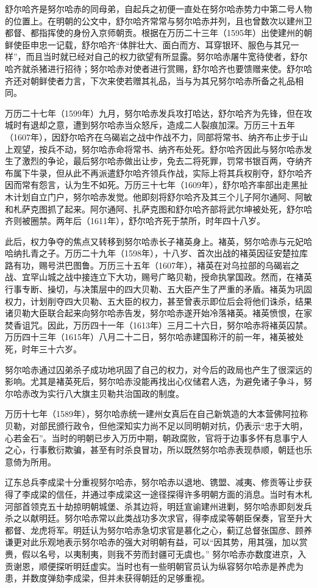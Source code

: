舒尔哈齐是努尔哈赤的同母弟，自起兵之初便一直处在努尔哈赤势力中第二号人物的位置上。在明朝的公文中，舒尔哈齐常常与努尔哈赤并列，且也曾数次以建州卫都督、都指挥使的身份入京师朝贡。根据在万历二十三年（1595年）出使建州的朝鲜使臣申忠一记载，舒尔哈齐“体胖壮大、面白而方、耳穿银环、服色与其兄一样”，而且当时就已经对自己的权力欲望有所显露。努尔哈赤屠牛宽待使者，舒尔哈齐就杀猪进行招待；努尔哈赤对使者进行赏赐，舒尔哈齐也要馈赠来使。舒尔哈齐还对朝鲜使者力言，下次来使若赠其礼品，当与为其兄努尔哈赤所备之礼品相同。

万历二十七年（1599年）九月，努尔哈赤发兵攻打哈达，舒尔哈齐为先锋，但在攻城时有退却之意，遭到努尔哈赤当众怒斥，造成二人裂痕加深。万历三十五年（1607年），因舒尔哈齐在乌碣岩之战中作战不力，同部将常书、纳齐布止步于山上观望，按兵不动，努尔哈赤命将常书、纳齐布处死。舒尔哈齐因此与努尔哈赤发生了激烈的争论，最后努尔哈赤做出让步，免去二将死罪，罚常书银百两，夺纳齐布属下牛录，但从此不再派遣舒尔哈齐领兵作战，实际上将其兵权削夺，舒尔哈齐因而常有怨言，认为生不如死。万历三十七年（1609年），舒尔哈齐率部出走黑扯木计划自立门户，努尔哈赤发觉。他即刻将舒尔哈齐及其三个儿子阿尔通阿、阿敏和札萨克图抓了起来。阿尔通阿、扎萨克图和舒尔哈齐部将武尔坤被处死，舒尔哈齐则被圈禁。两年后（1611年），舒尔哈齐死于禁所，时年四十八岁。

此后，权力争夺的焦点又转移到努尔哈赤长子褚英身上。褚英，努尔哈赤与元妃哈哈纳扎青之子。万历二十九年（1598年），十八岁、首次出战的褚英因征安楚拉库路有功，赐号洪巴图鲁。万历三十五年（1607年），褚英在对乌拉部的乌碣岩之战、宜罕山城之战中接连立下大功，赐号广略贝勒，授命执掌国政。然而，在褚英行事专断、操切，与决策层中的四大贝勒、五大臣产生了严重的矛盾。褚英为巩固权力，计划削夺四大贝勒、五大臣的权力，甚至曾表示即位后会将他们诛杀，结果诸贝勒大臣联合起来向努尔哈赤告发，努尔哈赤遂开始冷落褚英。褚英愤恨，在家焚香诅咒。因此，万历四十一年（1613年）三月二十六日，努尔哈赤将褚英囚禁。万历四十三年（1615年）八月二十二日，努尔哈赤建国称汗的前一年，褚英被处死，时年三十六岁。

努尔哈赤通过囚弟杀子成功地巩固了自己的权力，对今后的政局也产生了很深远的影响。尤其是褚英死后，努尔哈赤没能再找出心仪储君人选，为避免诸子争斗，努尔哈赤改为实行八大旗主贝勒共治国政的制度。

万历十七年（1589年），努尔哈赤统一建州女真后在自己新筑造的大本营佛阿拉称贝勒，对部民颁行政令，但他深知实力尚不足以同明朝对抗，仍表示“忠于大明，心若金石”。当时的明朝已步入万历中期，朝政腐败，官将于边事多怀有息事宁人之心，行事敷衍欺骗，甚至有时杀良冒功，所以既然努尔哈赤表现恭顺，朝廷也乐意倚为所用。

辽东总兵李成梁十分重视努尔哈赤，努尔哈赤以退地、镌盟、减夷、修贡等让步获得了李成梁的信任，并通过李成梁这一途径探得许多明朝方面的消息。当时有木札河部首领克五十劫掠明朝城堡、杀其边将，明廷宣谕建州进剿，努尔哈赤即刻发兵杀之以献明廷。努尔哈赤常以此类战功多次求官，得李成梁等朝臣保奏，官至升大都督、龙虎将军。明廷认为努尔哈赤急切求官是慕化之心，蓟辽总督张国彦、顾养谦更对此乐观地表示努尔哈赤的强大对明朝有益，可以“因其势，用其强，加以赏赉，假以名号，以夷制夷，则我不劳而封疆可无虞也。” 努尔哈赤亦数度进京，入贡谢恩，顺便探听明廷虚实。当时也有一些明朝官员认为纵容努尔哈赤是养虎为患，并数度弹劾李成梁，但并未获得朝廷的足够重视。

